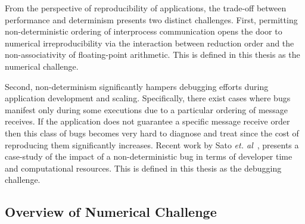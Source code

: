 
From the perspective of reproducibility of applications, the trade-off
between performance and determinism presents two distinct
challenges. First, permitting non-deterministic ordering of
interprocess communication opens the door to numerical
irreproducibility via the interaction between reduction order and the
non-associativity of floating-point arithmetic. This is
defined in this thesis as the numerical challenge.

Second, non-determinism significantly hampers debugging efforts during
application development and scaling. Specifically, there exist cases
where bugs manifest only during some executions due to a particular
ordering of message receives. If the application does not guarantee a
specific message receive order then this class of bugs becomes very
hard to diagnose and treat since the cost of reproducing them
significantly increases. Recent work by 
Sato \textit{et. al}~\cite{NINJA:Sato:2017}, 
presents a case-study of the impact of a
non-deterministic bug in terms of developer time and computational
resources. This is defined in this thesis as the debugging challenge.


\subsection{Overview of Numerical Challenge} 

